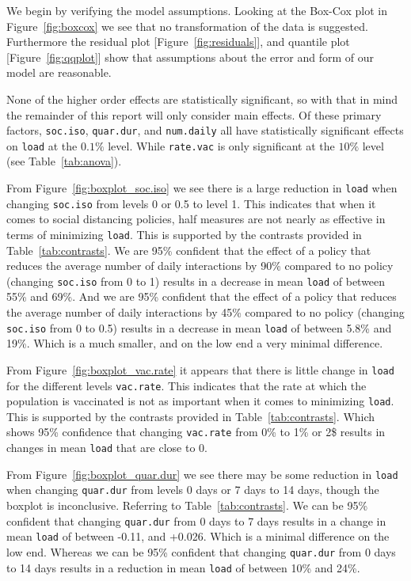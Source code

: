 \documentclass[12pt,a4paper]{article}
\begin{document}
We begin by verifying the model assumptions. Looking at the Box-Cox plot in Figure~\ref{fig:boxcox} we see that no transformation of the data is suggested. Furthermore the  residual plot [Figure~\ref{fig:residuals}], and quantile plot [Figure~\ref{fig:qqplot}] show that assumptions about the error and form of our model are reasonable.

None of the higher order effects are statistically significant, so with that in mind the remainder of this report will only consider main effects. Of these primary factors, \verb`soc.iso`, \verb`quar.dur`, and \verb`num.daily` all have statistically significant effects on \verb`load` at the $0.1\%$ level. While \verb`rate.vac` is only significant at the $10\%$ level (see Table~\ref{tab:anova}).

From Figure~\ref{fig:boxplot_soc.iso} we see there is a large reduction in \verb`load` when changing \verb`soc.iso` from levels 0 or 0.5 to level 1. This indicates that when it comes to social distancing policies, half measures are not nearly as effective in terms of minimizing \verb`load`. This is supported by the contrasts provided in Table~\ref{tab:contrasts}. We are 95\% confident that the effect of a policy that reduces the average number of daily interactions by 90\% compared to no policy (changing \verb`soc.iso` from 0 to 1) results in a decrease in mean \verb`load` of between 55\% and 69\%. And we are 95\% confident that the effect of a policy that reduces the average number of daily interactions by 45\% compared to no policy (changing \verb`soc.iso` from 0 to 0.5) results in a decrease in mean \verb`load` of between 5.8\% and 19\%. Which is a much smaller, and on the low end a very minimal difference.

From Figure~\ref{fig:boxplot_vac.rate} it appears that there is little change in \verb`load` for the different levels \verb`vac.rate`. This indicates that the rate at which the population is vaccinated is not as important when it comes to minimizing \verb`load`. This is supported by the contrasts provided in Table~\ref{tab:contrasts}. Which shows 95\% confidence that changing \verb`vac.rate` from 0\% to 1\% or 2\$ results in changes in mean \verb`load` that are close to 0.

From Figure~\ref{fig:boxplot_quar.dur} we see there may be some reduction in \verb`load` when changing \verb`quar.dur` from levels 0 days or 7 days to 14 days, though the boxplot is inconclusive. Referring to Table~\ref{tab:contrasts}. We can be 95\% confident that changing \verb`quar.dur` from 0 days to 7 days results in a change in mean \verb`load` of between -0.11, and +0.026. Which is a minimal difference on the low end. Whereas we can be 95\% confident that changing \verb`quar.dur` from 0 days to 14 days results in a reduction in mean \verb`load` of between 10\% and 24\%. 
\end{document}
